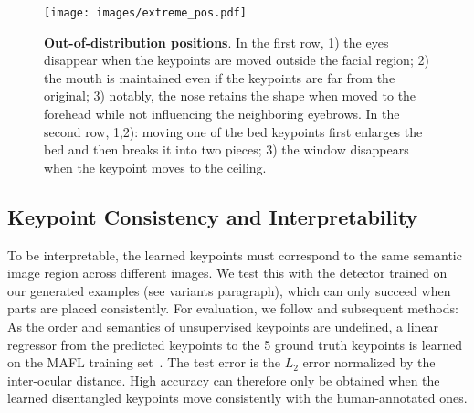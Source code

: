 \documentclass[10pt, conference, compsocconf]{IEEEtran}
\begin{document}
\begin{table}
 \vspace{-0pt}
 \begin{center}
\end{center}
\caption{\textbf{Quantitative ablation on keypoint localization} (
}
\label{tab:ablation_archi}\end{table}

\begin{figure}[t!]
\begin{center}
\texttt{[image: images/extreme\_pos.pdf]}
\end{center}
  \caption{\textbf{Out-of-distribution positions}. In the first row, 1) the eyes disappear when the keypoints are moved outside the facial region; 2) the mouth is maintained even if the keypoints are far from the original; 3) notably, the nose retains the shape when moved to the forehead while not influencing the neighboring eyebrows. In the second row, 1,2): moving one of the bed keypoints first enlarges the bed and then breaks it into two pieces; 3) the window disappears when the keypoint moves to the ceiling.}
\label{fig:extreme_pos}
\end{figure}

\subsection{Keypoint Consistency and Interpretability} \label{sec:unsupervised_keypoints_discovery}
To be interpretable, the learned keypoints must correspond to the same semantic image region across different images. We test this with the detector trained on our generated examples (see variants paragraph), which can only succeed when parts are placed consistently.
For evaluation, we follow \cite{thewlis2017unsupervised} and subsequent methods: As the order and semantics of unsupervised keypoints are undefined, a linear regressor from the predicted keypoints to the 5 ground truth keypoints is learned on the MAFL training set~\cite{zhang2014facial}.
The test error is the $L_2$ error normalized by the inter-ocular distance.
High accuracy can therefore only be obtained when the learned disentangled keypoints move consistently with the human-annotated ones. 
\end{document}
